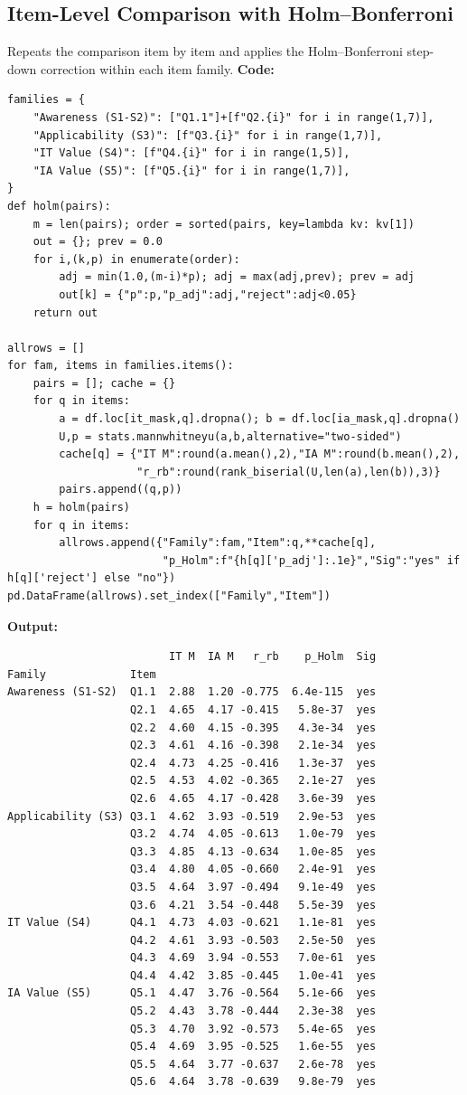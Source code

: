 \subsection{Item-Level Comparison with Holm--Bonferroni}
Repeats the comparison item by item and applies the Holm--Bonferroni step-down correction within each item family.
\noindent\textbf{Code:}\nopagebreak
{\tiny\begin{verbatim}
families = {
    "Awareness (S1-S2)": ["Q1.1"]+[f"Q2.{i}" for i in range(1,7)],
    "Applicability (S3)": [f"Q3.{i}" for i in range(1,7)],
    "IT Value (S4)": [f"Q4.{i}" for i in range(1,5)],
    "IA Value (S5)": [f"Q5.{i}" for i in range(1,7)],
}
def holm(pairs):
    m = len(pairs); order = sorted(pairs, key=lambda kv: kv[1])
    out = {}; prev = 0.0
    for i,(k,p) in enumerate(order):
        adj = min(1.0,(m-i)*p); adj = max(adj,prev); prev = adj
        out[k] = {"p":p,"p_adj":adj,"reject":adj<0.05}
    return out

allrows = []
for fam, items in families.items():
    pairs = []; cache = {}
    for q in items:
        a = df.loc[it_mask,q].dropna(); b = df.loc[ia_mask,q].dropna()
        U,p = stats.mannwhitneyu(a,b,alternative="two-sided")
        cache[q] = {"IT M":round(a.mean(),2),"IA M":round(b.mean(),2),
                    "r_rb":round(rank_biserial(U,len(a),len(b)),3)}
        pairs.append((q,p))
    h = holm(pairs)
    for q in items:
        allrows.append({"Family":fam,"Item":q,**cache[q],
                        "p_Holm":f"{h[q]['p_adj']:.1e}","Sig":"yes" if h[q]['reject'] else "no"})
pd.DataFrame(allrows).set_index(["Family","Item"])
\end{verbatim}}
\noindent\textbf{Output:}\nopagebreak
{\scriptsize\begin{verbatim}
                         IT M  IA M   r_rb    p_Holm  Sig
Family             Item
Awareness (S1-S2)  Q1.1  2.88  1.20 -0.775  6.4e-115  yes
                   Q2.1  4.65  4.17 -0.415   5.8e-37  yes
                   Q2.2  4.60  4.15 -0.395   4.3e-34  yes
                   Q2.3  4.61  4.16 -0.398   2.1e-34  yes
                   Q2.4  4.73  4.25 -0.416   1.3e-37  yes
                   Q2.5  4.53  4.02 -0.365   2.1e-27  yes
                   Q2.6  4.65  4.17 -0.428   3.6e-39  yes
Applicability (S3) Q3.1  4.62  3.93 -0.519   2.9e-53  yes
                   Q3.2  4.74  4.05 -0.613   1.0e-79  yes
                   Q3.3  4.85  4.13 -0.634   1.0e-85  yes
                   Q3.4  4.80  4.05 -0.660   2.4e-91  yes
                   Q3.5  4.64  3.97 -0.494   9.1e-49  yes
                   Q3.6  4.21  3.54 -0.448   5.5e-39  yes
IT Value (S4)      Q4.1  4.73  4.03 -0.621   1.1e-81  yes
                   Q4.2  4.61  3.93 -0.503   2.5e-50  yes
                   Q4.3  4.69  3.94 -0.553   7.0e-61  yes
                   Q4.4  4.42  3.85 -0.445   1.0e-41  yes
IA Value (S5)      Q5.1  4.47  3.76 -0.564   5.1e-66  yes
                   Q5.2  4.43  3.78 -0.444   2.3e-38  yes
                   Q5.3  4.70  3.92 -0.573   5.4e-65  yes
                   Q5.4  4.69  3.95 -0.525   1.6e-55  yes
                   Q5.5  4.64  3.77 -0.637   2.6e-78  yes
                   Q5.6  4.64  3.78 -0.639   9.8e-79  yes
\end{verbatim}}

